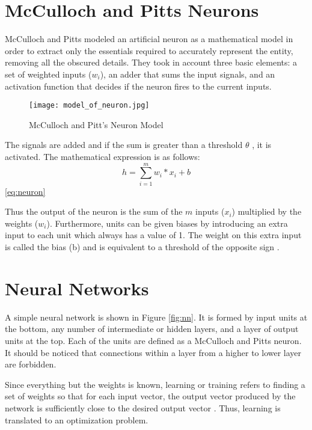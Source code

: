 \section{McCulloch and Pitts Neurons}
McCulloch and Pitts modeled an artificial neuron as a mathematical model in order to extract only the essentials required to accurately represent the entity, removing all the obscured details. They took in account three basic elements: a set of weighted inputs ($w_i$), an adder that sums the input signals, and an activation function that decides if the neuron fires to the current inputs.
\begin{figure}[h]
\centering
 
\texttt{[image: model\_of\_neuron.jpg]}
\caption{McCulloch and Pitt's Neuron Model}
\label{fig:neuron}
\end{figure}

The signals are added and if the sum is greater than a threshold $\theta$ , it is activated. The mathematical expression is as follows:\\
\begin{equation} \label{eq:neuron}
h=\sum_{i=1}^{m} w_i * x_i + b
\end{equation}\ref{eq:neuron}

Thus the output of the neuron is the sum of the $m$ inputs ($x_i$) multiplied by the weights ($w_i$). Furthermore, units can be given biases by introducing an extra input to each unit which always has a value of 1. The weight on this extra input is called the bias (b) and is equivalent to a threshold of the opposite sign \cite{polk2002cognitive}. 


\section{Neural Networks}

A simple neural network is shown in Figure \ref{fig:nn}. It is formed by input units at the bottom, any number of intermediate or hidden layers, and a layer of output units at the top. Each of the units are  defined as a McCulloch and Pitts neuron. It should be noticed that connections within a layer from a higher to lower layer are forbidden. 

Since everything but the weights is known, learning or training refers to finding a set of weights so that for each input vector, the output vector produced by the network is sufficiently close to the desired output vector \cite{polk2002cognitive}. Thus, learning is translated to an optimization problem.

